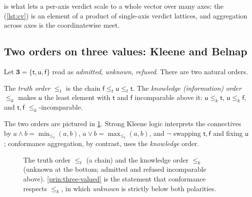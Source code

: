 is what lets a per-axis verdict scale to a whole
vector over many axes: the  (\cref{lst:cv}) is an element
of a product of single-axis verdict lattices, and aggregation across axes is the
coordinatewise meet.

\subsection{Two orders on three values: Kleene and Belnap}
\label{sec:order-kleene}

Let $\mathbf 3=\{\mathsf t,\mathsf u,\mathsf f\}$ read as \emph{admitted},
\emph{unknown}, \emph{refused}. There are two natural orders.

\begin{definition}
The \emph{truth order} $\le_t$ is the chain $\mathsf f\le_t\mathsf u\le_t\mathsf
t$. The \emph{knowledge (information) order} $\le_k$ makes $\mathsf u$ the least
element with $\mathsf t$ and $\mathsf f$ incomparable above it:
$\mathsf u\le_k\mathsf t$, $\mathsf u\le_k\mathsf f$, and $\mathsf t,\mathsf f$
$\le_k$-incomparable.
\end{definition}

\noindent The two orders are pictured in \cref{fig:k3}. Strong Kleene logic
interprets the connectives by $a\wedge b=\min_{\le_t}(a,b)$, $a\vee
b=\max_{\le_t}(a,b)$, and $\neg$ swapping $\mathsf t,\mathsf f$ and fixing
$\mathsf u$; conformance aggregation, by contrast, uses the \emph{knowledge}
order.

\begin{figure}[t]
\centering
{}
\caption[The two orders on three values]{The truth order $\le_t$ (a chain) and
the knowledge order $\le_k$ (unknown at the bottom; admitted and refused
incomparable above). \cref{prin:three-valued} is the statement that conformance
respects $\le_k$, in which \emph{unknown} is strictly below both polarities.}
\label{fig:k3}
\end{figure}

